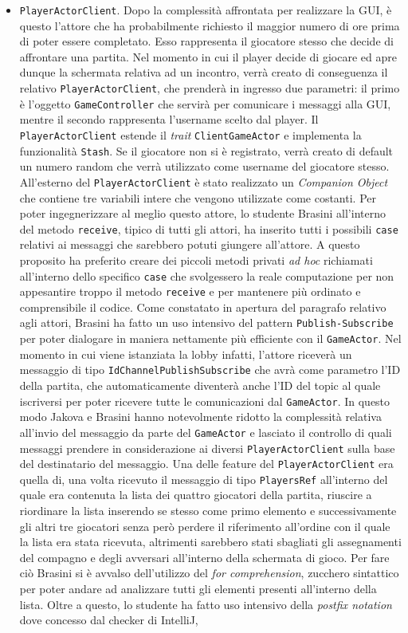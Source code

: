 \begin{itemize}
     \item \texttt{PlayerActorClient}.
     Dopo la complessità affrontata per realizzare la GUI, è questo l'attore che ha probabilmente richiesto il maggior numero di ore prima di poter essere completato. Esso rappresenta il giocatore stesso che decide di affrontare una partita. Nel momento in cui il player decide di giocare ed apre dunque la schermata relativa ad un incontro, verrà creato di conseguenza il relativo \texttt{PlayerActorClient}, che prenderà in ingresso due parametri: il primo è l'oggetto \texttt{GameController} che servirà per comunicare i messaggi alla GUI, mentre il secondo rappresenta l'username scelto dal player. Il \texttt{PlayerActorClient} estende il \textit{trait} \texttt{ClientGameActor} e implementa la funzionalità \texttt{Stash}. Se il giocatore non si è registrato, verrà creato di default un numero random che verrà utilizzato come username del giocatore stesso. All'esterno del \texttt{PlayerActorClient} è stato realizzato un \textit{Companion Object} che contiene tre variabili intere che vengono utilizzate come costanti. Per poter ingegnerizzare al meglio questo attore, lo studente Brasini all'interno del metodo \texttt{receive}, tipico di tutti gli attori, ha inserito tutti i possibili \texttt{case} relativi ai messaggi che sarebbero potuti giungere all'attore. A questo proposito ha preferito creare dei piccoli metodi privati \textit{ad hoc} richiamati all'interno dello specifico \texttt{case} che svolgessero la reale computazione per non appesantire troppo il metodo \texttt{receive} e per mantenere più ordinato e comprensibile il codice. Come constatato in apertura del paragrafo relativo agli attori, Brasini ha fatto un uso intensivo del pattern \texttt{Publish-Subscribe} per poter dialogare in maniera nettamente più efficiente con il \texttt{GameActor}. Nel momento in cui viene istanziata la lobby infatti, l'attore riceverà un messaggio di tipo \texttt{IdChannelPublishSubscribe} che avrà come parametro l'ID della partita, che automaticamente diventerà anche l'ID del topic al quale iscriversi per poter ricevere tutte le comunicazioni dal \texttt{GameActor}. In questo modo Jakova e Brasini hanno notevolmente ridotto la complessità relativa all'invio del messaggio da parte del \texttt{GameActor} e lasciato il controllo di quali messaggi prendere in considerazione ai diversi \texttt{PlayerActorClient} sulla base del destinatario del messaggio. Una delle feature del \texttt{PlayerActorClient} era quella di, una volta ricevuto il messaggio di tipo \texttt{PlayersRef} all'interno del quale era contenuta la lista dei quattro giocatori della partita, riuscire a riordinare la lista inserendo se stesso come primo elemento e successivamente gli altri tre giocatori senza però perdere il riferimento all'ordine con il quale la lista era stata ricevuta, altrimenti sarebbero stati sbagliati gli assegnamenti del compagno e degli avversari all'interno della schermata di gioco. Per fare ciò Brasini si è avvalso dell'utilizzo del \textit{for comprehension}, zucchero sintattico per poter andare ad analizzare tutti gli elementi presenti all'interno della lista. Oltre a questo, lo studente ha fatto uso intensivo della \textit{postfix notation} dove concesso dal checker di IntelliJ, 
\end{itemize}
